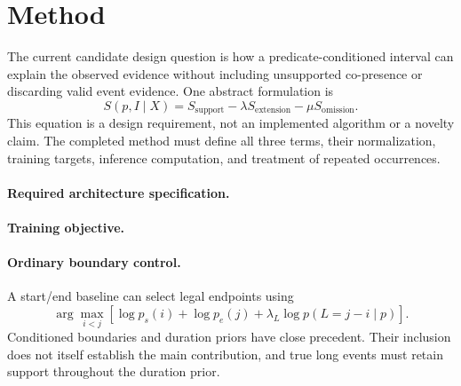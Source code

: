 \section{Method}

The current candidate design question is how a predicate-conditioned interval
can explain the observed evidence without including unsupported co-presence or
discarding valid event evidence. One abstract formulation is
\begin{equation}
S(p,I\mid X)=S_{\mathrm{support}}-\lambda S_{\mathrm{extension}}
-\mu S_{\mathrm{omission}}.
\end{equation}
This equation is a design requirement, not an implemented algorithm or a novelty
claim. The completed method must define all three terms, their normalization,
training targets, inference computation, and treatment of repeated occurrences.

\paragraph{Required architecture specification.}

\paragraph{Training objective.}

\paragraph{Ordinary boundary control.}
A start/end baseline can select legal endpoints using
\begin{equation}
\arg\max_{i<j}\left[\log p_s(i)+\log p_e(j)+
\lambda_L\log p(L=j-i\mid p)\right].
\end{equation}
Conditioned boundaries and duration priors have close precedent. Their inclusion
does not itself establish the main contribution, and true long events must retain
support throughout the duration prior.
